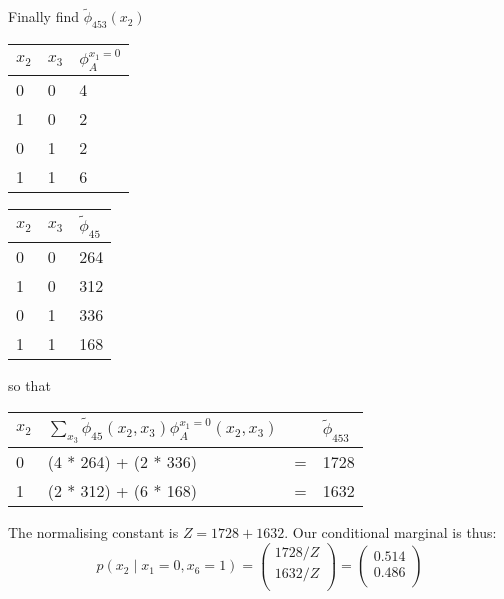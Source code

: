 \begin{exenumerate}
\begin{solution}
    Finally find $\tilde{\phi}_{453}(x_2)$
    \begin{center}
      \begin{tabular}{lll}
        \toprule
        $x_2$ & $x_3$ & $\phi_A^{x_1=0}$\\
        \midrule
        0 & 0 & 4 \\
        1 & 0 & 2 \\
        0 & 1 & 2 \\
        1 & 1 & 6 \\
        \bottomrule
      \end{tabular}\hspace{2ex}
      \begin{tabular}{lll}
        \toprule
        $x_2$ & $x_3$ & $\tilde{\phi}_{45}$\\
        \midrule
        0 & 0 & 264 \\
        1 & 0 & 312 \\
        0 & 1 & 336 \\
        1 & 1 & 168 \\
        \bottomrule
      \end{tabular}
      \end{center}
    so that
    \begin{center}
      \begin{tabular}{llll}
        \toprule
        $x_2$ & $\sum_{x_3} \tilde{\phi}_{45}(x_2, x_3) \phi_A^{x_1=0}(x_2,x_3)$  &  & $\tilde{\phi}_{453}$\\
        \midrule
        0 & (4 * 264) + (2 * 336) & = & 1728 \\
        1 & (2 * 312) + (6 * 168) & = & 1632 \\
        \bottomrule
      \end{tabular}
    \end{center}\vspace{1ex}

   The normalising constant is $Z = 1728 + 1632$. Our conditional marginal is thus:
    \begin{equation}
      p(x_2 \mid x_1=0, x_6=1) = 
      \begin{pmatrix}
        1728 / Z \\
        1632 / Z \\
      \end{pmatrix} = 
      \begin{pmatrix}
        0.514 \\
        0.486 \\
      \end{pmatrix}
    \end{equation}


\end{solution}
\end{exenumerate}
